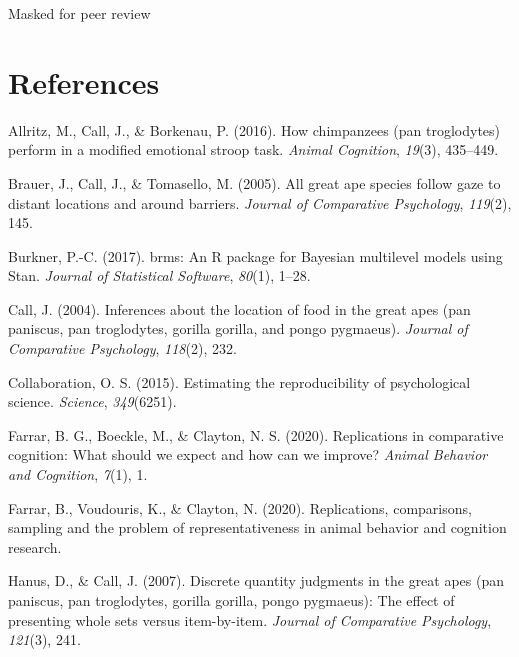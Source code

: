 \documentclass[10pt, letterpaper]{article}
\begin{document}
Masked for peer review

\hypertarget{references}{%
\section{References}\label{references}}

\setlength{\parindent}{-0.1in} 
\setlength{\leftskip}{0.125in}

\noindent

\hypertarget{refs}{}
\leavevmode\hypertarget{ref-allritz2016chimpanzees}{}%
Allritz, M., Call, J., \& Borkenau, P. (2016). How chimpanzees (pan
troglodytes) perform in a modified emotional stroop task. \emph{Animal
Cognition}, \emph{19}(3), 435--449.

\leavevmode\hypertarget{ref-brauer2005all}{}%
Brauer, J., Call, J., \& Tomasello, M. (2005). All great ape species
follow gaze to distant locations and around barriers. \emph{Journal of
Comparative Psychology}, \emph{119}(2), 145.

\leavevmode\hypertarget{ref-R-brms_a}{}%
Burkner, P.-C. (2017). brms: An R package for Bayesian multilevel models
using Stan. \emph{Journal of Statistical Software}, \emph{80}(1), 1--28.

\leavevmode\hypertarget{ref-call2004inferences}{}%
Call, J. (2004). Inferences about the location of food in the great apes
(pan paniscus, pan troglodytes, gorilla gorilla, and pongo pygmaeus).
\emph{Journal of Comparative Psychology}, \emph{118}(2), 232.

\leavevmode\hypertarget{ref-open2015estimating}{}%
Collaboration, O. S. (2015). Estimating the reproducibility of
psychological science. \emph{Science}, \emph{349}(6251).

\leavevmode\hypertarget{ref-farrar2020replicomp}{}%
Farrar, B. G., Boeckle, M., \& Clayton, N. S. (2020). Replications in
comparative cognition: What should we expect and how can we improve?
\emph{Animal Behavior and Cognition}, \emph{7}(1), 1.

\leavevmode\hypertarget{ref-farrar2020replications}{}%
Farrar, B., Voudouris, K., \& Clayton, N. (2020). Replications,
comparisons, sampling and the problem of representativeness in animal
behavior and cognition research.

\leavevmode\hypertarget{ref-hanus2007discrete}{}%
Hanus, D., \& Call, J. (2007). Discrete quantity judgments in the great
apes (pan paniscus, pan troglodytes, gorilla gorilla, pongo pygmaeus):
The effect of presenting whole sets versus item-by-item. \emph{Journal
of Comparative Psychology}, \emph{121}(3), 241.
\end{document}
